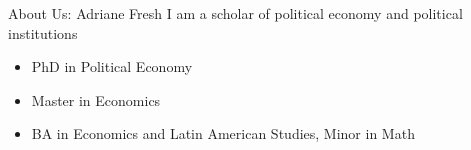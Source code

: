 \documentclass[11pt]{beamer}
\begin{document}

\begin{frame}[c]{About Us: Adriane Fresh}
	I am a scholar of political economy and political institutions \\
	\vspace{0.5cm}
	\begin{itemize}
		\pause \item PhD in Political Economy
		\pause \item Master in Economics
		\pause \item BA in Economics and Latin American Studies, Minor in Math
	\end{itemize}
\end{frame}
\end{document}
